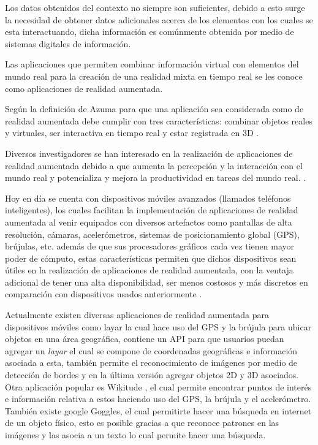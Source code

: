 \documentclass[12pt,a4paper,spanish,openany]{book}
\begin{document}
Los datos obtenidos del contexto no siempre son suficientes, debido a esto surge
la necesidad de obtener datos adicionales acerca de los elementos con los
cuales se esta interactuando, dicha información es comúnmente  obtenida por
medio de sistemas digitales de información.

Las aplicaciones que permiten combinar información virtual con elementos del
mundo real para la creación de una realidad mixta en tiempo real se les conoce
como aplicaciones de realidad aumentada.

Según la definición de Azuma para que una aplicación sea considerada como de
realidad aumentada debe cumplir con tres características: combinar objetos reales
y virtuales, ser interactiva en tiempo real y estar registrada en
3D \cite{Azuma97asurvey}.

Diversos investigadores se han interesado en la realización de aplicaciones de
realidad aumentada debido a que aumenta la percepción y la interacción con el
mundo real y potencializa y mejora la productividad en tareas del mundo real.
\cite{Azuma:2004:OAR:1103900.1103926}.

Hoy en día se cuenta con dispositivos móviles avanzados (llamados teléfonos
inteligentes), los cuales facilitan la implementación de aplicaciones de
realidad aumentada al venir equipados con diversos artefactos como pantallas de
alta resolución, cámaras, acelerómetros, sistemas de posicionamiento global
(GPS), brújulas, etc. \cite{bb86741} además de que sus procesadores gráficos
cada vez tienen mayor poder de cómputo, estas características permiten que
dichos dispositivos sean útiles en la realización de aplicaciones de realidad
aumentada, con la ventaja adicional de tener una alta disponibilidad, ser menos
costosos y más discretos en comparación con dispositivos usados anteriormente
 \cite{bb86741}.

Actualmente existen diversas aplicaciones de realidad aumentada para
dispositivos móviles como layar \cite{layar} la cual hace uso del GPS y la
brújula para ubicar objetos en una área geográfica, contiene un API para que
usuarios puedan agregar un \emph{layar} el cual se compone de coordenadas
geográficas e información asociada a esta, también permite el reconocimiento
de imágenes por medio de detección de bordes y en la última versión agregar
objetos 2D y 3D asociados. Otra aplicación popular es Wikitude \cite{wikitude},
el cual permite encontrar puntos de interés e información relativa a estos
haciendo uso del GPS, la brújula y el acelerómetro. También existe google
Goggles\cite{goggles}, el cual permitirte hacer una búsqueda en internet de un
objeto físico, esto es posible gracias a que reconoce patrones en las
imágenes y las asocia a un texto lo cual permite hacer una búsqueda.
\end{document}

